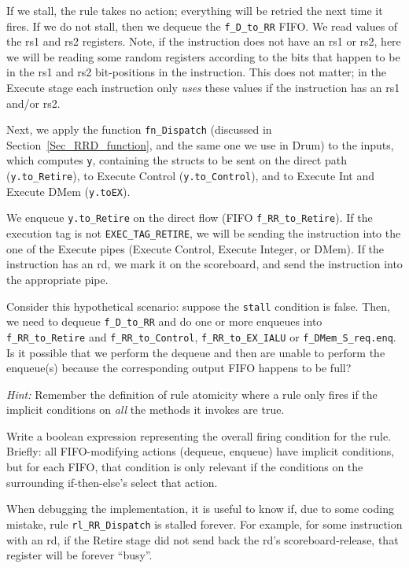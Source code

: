 If we stall, the rule takes no action; everything will be retried the
next time it fires.  If we do not stall, then we dequeue the
\verb|f_D_to_RR| FIFO.  We read values of the rs1 and rs2 registers.
Note, if the instruction does not have an rs1 or rs2, here we will be
reading some random registers according to the bits that happen to be
in the rs1 and rs2 bit-positions in the instruction.  This does not
matter; in the Execute stage each instruction only \emph{uses} these
values if the instruction has an rs1 and/or rs2.

Next, we apply the function \verb|fn_Dispatch| (discussed in
Section~\ref{Sec_RRD_function}, and the same one we use in Drum) to
the inputs, which computes \verb|y|, containing the structs to be sent
on the direct path (\verb|y.to_Retire|), to Execute Control
(\verb|y.to_Control|), and to Execute Int and Execute DMem
(\verb|y.toEX|).

We enqueue \verb|y.to_Retire| on the direct flow (FIFO
\verb|f_RR_to_Retire|).  If the execution tag is not
\verb|EXEC_TAG_RETIRE|, we will be sending the instruction into the
one of the Execute pipes (Execute Control, Execute Integer, or DMem).
If the instruction has an rd, we mark it on the scoreboard, and send
the instruction into the appropriate pipe.

\hdivider

\Exercise

Consider this hypothetical scenario: suppose the \verb|stall|
condition is false.  Then, we need to dequeue \verb|f_D_to_RR| and do
one or more enqueues into \verb|f_RR_to_Retire| and
\verb|f_RR_to_Control|, \verb|f_RR_to_EX_IALU| or
\verb|f_DMem_S_req.enq|.  Is it possible that we perform the dequeue
and then are unable to perform the enqueue(s) because the
corresponding output FIFO happens to be full?

\emph{Hint:} Remember the definition of rule atomicity where a rule
only fires if the implicit conditions on \emph{all} the methods it
invokes are true.

\Exercise

Write a boolean expression representing the overall firing condition
for the rule.  Briefly: all FIFO-modifying actions (dequeue, enqueue)
have implicit conditions, but for each FIFO, that condition is only
relevant if the conditions on the surrounding if-then-else's select
that action.

\Exercise

When debugging the implementation, it is useful to know if, due to
some coding mistake, rule \verb|rl_RR_Dispatch| is stalled forever.
For example, for some instruction with an rd, if the Retire stage did
not send back the rd's scoreboard-release, that register will be
forever ``busy''.

